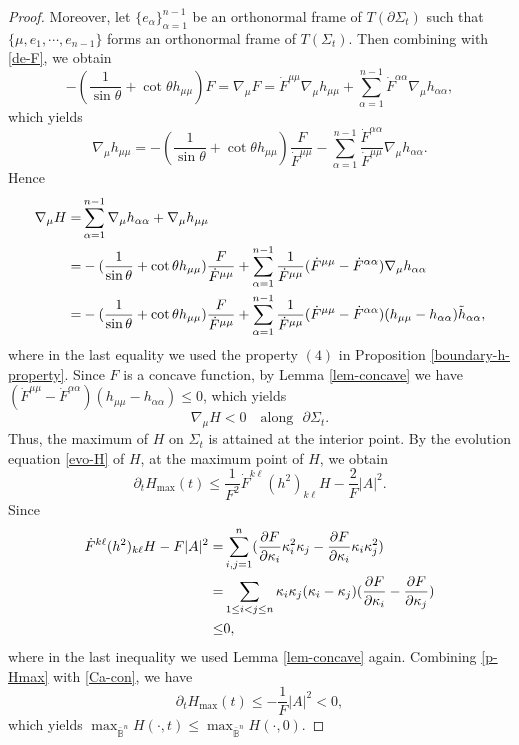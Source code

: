 \documentclass[11pt,reqno]{amsart}
\theoremstyle{definition}
\theoremstyle{remark}
\numberwithin{equation}{section}
\renewcommand{\(}{\left(}
\renewcommand{\)}{\right)}
\renewcommand{\-}{\overline}
\begin{document}
\begin{proof}
Moreover, let $\{e_{\alpha}\}_{\alpha=1}^{n-1}$ be an orthonormal frame of $T(\partial\Sigma_t)$ such that $\{\mu,e_1,\cdots,e_{n-1}\}$ forms an orthonormal frame of $T(\Sigma_t)$. Then combining with \eqref{de-F}, we obtain
\begin{equation*}
	-(\frac{1}{\sin\theta}+\cot\theta h_{\mu\mu})F=\nabla_{\mu}F=\dot{F}^{\mu\mu}\nabla_{\mu}h_{\mu\mu}+\sum_{\alpha=1}^{n-1}\dot{F}^{\alpha\alpha}\nabla_{\mu}{h_{\alpha\alpha}},
\end{equation*}
which yields
\begin{equation}\label{nablahmumu}
	\nabla_{\mu}{h_{\mu\mu}}=-(\frac{1}{\sin\theta}+\cot\theta h_{\mu\mu})\frac{F}{\dot{F}^{\mu\mu}}-\sum_{\alpha=1}^{n-1}\frac{\dot{F}^{\alpha\alpha}}{\dot{F}^{\mu\mu}}\nabla_{\mu}{h_{\alpha\alpha}}.
\end{equation}
Hence
\begin{align}
	\nabla_{\mu}H=&\sum_{\alpha=1}^{n-1}\nabla_{\mu}{h_{\alpha\alpha}}+\nabla_{\mu}{h_{\mu\mu}}\notag\\
	=&-(\frac{1}{\sin\theta}+\cot\theta h_{\mu\mu})\frac{F}{\dot{F}^{\mu\mu}}+\sum_{\alpha=1}^{n-1}\frac{1}{\dot{F}^{\mu\mu}}(\dot{F}^{\mu\mu}-\dot{F}^{\alpha\alpha})\nabla_{\mu}h_{\alpha\alpha}\notag\\
	=&-(\frac{1}{\sin\theta}+\cot\theta h_{\mu\mu})\frac{F}{\dot{F}^{\mu\mu}}+\sum_{\alpha=1}^{n-1}\frac{1}{\dot{F}^{\mu\mu}}(\dot{F}^{\mu\mu}-\dot{F}^{\alpha\alpha})(h_{\mu\mu}-h_{\alpha\alpha})\tilde{h}_{\alpha\alpha},
\end{align}
where in the last equality we used the property $(4)$ in Proposition \ref{boundary-h-property}. Since $F$ is a concave function,  by Lemma \ref{lem-concave} we have $(\dot{F}^{\mu\mu}-\dot{F}^{\alpha\alpha})(h_{\mu\mu}-h_{\alpha\alpha})\leq 0$, which yields
\begin{equation}
	\nabla_{\mu} H<0 \quad \text{along}\,\,\,\, \partial\Sigma_t.
\end{equation}
Thus, the maximum of $H$ on $\Sigma_t$ is attained at the interior point. By the evolution equation \eqref{evo-H} of $H$,  at the maximum point of $H$, we obtain
\begin{equation}\label{p-Hmax}
	\partial_t H_{\max}(t)\leq \frac{1}{F^2}\dot{F}^{k\ell}(h^2)_{k\ell}H-\frac{2}{F}|A|^2.
\end{equation}
Since
\begin{align}
	\dot{F}^{k\ell}(h^2)_{k\ell}H-F|A|^2\notag
	=&\sum_{i,j=1}^n(\frac{\partial F}{\partial\kappa_i}\kappa_i^2\kappa_j-\frac{\partial F}{\partial\kappa_i}\kappa_i\kappa_j^2)\notag\\
	=&\sum_{1\leq i<j\leq n}\kappa_i\kappa_j(\kappa_i-\kappa_j)(\frac{\partial F}{\partial\kappa_i}-\frac{\partial F}{\partial\kappa_j})\notag\\
	\leq &0,\label{Ca-con}
\end{align}
where in the last inequality we used Lemma \ref{lem-concave} again. Combining \eqref{p-Hmax} with \eqref{Ca-con}, we have
\begin{equation}
	\partial_t H_{\max}(t)\leq -\frac{1}{F}|A|^2<0,
\end{equation}
which yields $\max_{\bar{\mathbb{B}}^n} H(\cdot,t)\leq \max_{\bar{\mathbb{B}}^n} H(\cdot,0)$.
\end{proof}
\end{document}
